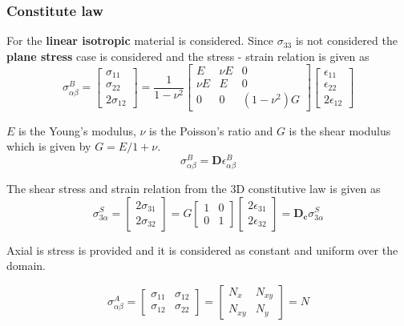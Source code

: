 \documentclass[9pt]{beamer}
\begin{document}
\begin{frame}
\frametitle{Constitute law}
For the \textbf{linear isotropic} material is considered. Since $\sigma_{33}$ is not considered the \textbf{plane stress} case is considered and the stress - strain relation is given as
\begin{equation*}
\sigma_{\alpha\beta}^B = \begin{bmatrix}
\sigma_{11}
\\
\sigma_{22}
\\
2 \sigma_{12}
\end{bmatrix}
=\dfrac{1}{1-\nu^2}
\begin{bmatrix}
E & \nu E & 0
\\
\nu E & E & 0
\\
0 & 0 & (1-\nu^2)G
\end{bmatrix}
\begin{bmatrix}
\epsilon_{11}
\\
\epsilon_{22}
\\
2 \epsilon_{12}
\end{bmatrix}
\end{equation*}



$E$ is the Young's modulus, $\nu$ is the Poisson's ratio and $G$ is the shear modulus which is given by $G=E / 1+\nu $. 
\begin{equation*}
\sigma_{\alpha\beta}^B = \mathbf{D} \epsilon_{\alpha\beta}^B
\end{equation*}
\end{frame}


\begin{frame}

The shear stress and strain relation from the 3D constitutive law is given as
\begin{equation*}
\sigma_{3\alpha}^S = \begin{bmatrix}
2 \sigma_{31}
\\
2 \sigma_{32}
\end{bmatrix}
=G
\begin{bmatrix}
1 & 0 
\\
0 & 1 
\end{bmatrix}
\begin{bmatrix}
2\epsilon_{31}
\\
2\epsilon_{32}
\end{bmatrix}
=
\mathbf{D_c}
\sigma_{3\alpha}^S
\end{equation*}

Axial is stress is provided and it is considered as constant and uniform over the domain.

\begin{equation*}
\sigma_{\alpha\beta}^A = \begin{bmatrix}
\sigma_{11} & \sigma_{12}
\\
\sigma_{12} & \sigma_{22}
\end{bmatrix}
=
\begin{bmatrix}
N_x & N_{xy}
\\
N_{xy} & N_y
\end{bmatrix}
=
N
\end{equation*}

\end{frame}
\end{document}
